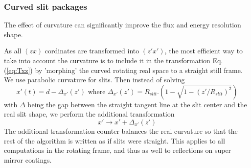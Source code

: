 \subsubsection{Curved slit packages}

The effect of curvature can significantly improve the flux and energy resolution shape.

As all $(zx)$ cordinates are transformed into $(z'x')$, the most efficient way to take into account the curvature is to include it in the transformation Eq. (\ref{eq:Txz}) by 'morphing' the curved rotating real space to a straight still frame. We use parabolic curvature for slits. Then instead of solving
\begin{equation}x'(t) = d - \Delta_{x'}(z') \textrm{\ where\ } \Delta_{x'}(z')=R_{slit}.(1-\sqrt{1-(z'/R_{slit})^2})
\end{equation}
with $\Delta$ being the gap between the straight tangent line at the slit center and the real slit shape, we perform the additional transformation
\begin{equation}
x' \rightarrow x' + \Delta_{x'}(z')
\end{equation}
The additional transformation counter-balances the real curvature so that the rest of the algorithm is written as if slits were straight.
This applies to all computations in the rotating frame, and thus as well to reflections on super mirror coatings.

